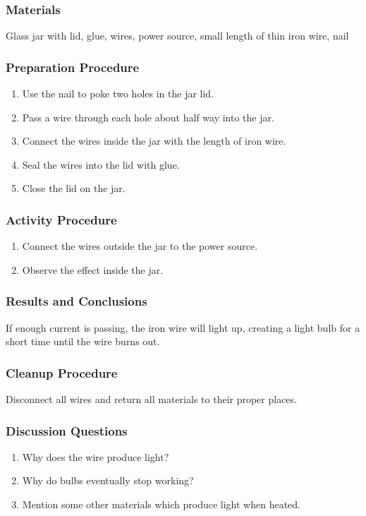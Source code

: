 \subsubsection*{Materials}
Glass jar with lid, glue, wires, power source, small length of thin iron wire, nail

\subsubsection*{Preparation Procedure}
\begin{enumerate}
\item{Use the nail to poke two holes in the jar lid.}
\item{Pass a wire through each hole about half way into the jar.}
\item{Connect the wires inside the jar with the length of iron wire.}
\item{Seal the wires into the lid with glue.}
\item{Close the lid on the jar.}
\end{enumerate}

\subsubsection*{Activity Procedure}
\begin{enumerate}
\item{Connect the wires outside the jar to the power source.}
\item{Observe the effect inside the jar.}
\end{enumerate}

\subsubsection*{Results and Conclusions}
If enough current is passing, the iron wire will light up, creating a light bulb for a short time until the
wire burns out.  

\subsubsection*{Cleanup Procedure}
Disconnect all wires and return all materials to their proper places.

\subsubsection*{Discussion Questions}
\begin{enumerate}
\item{Why does the wire produce light?}
\item{Why do bulbs eventually stop working?}
\item{Mention some other materials which produce light when heated.}
\end{enumerate}

